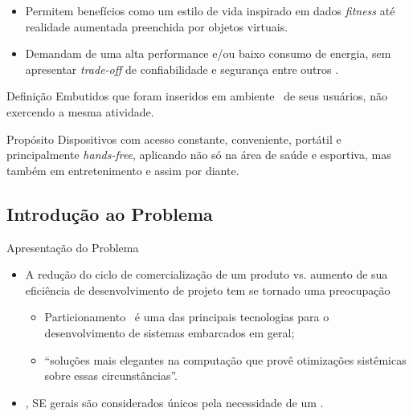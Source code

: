       
      \begin{frame}{\Wearables}
         \begin{itemize}
            \item Permitem benefícios como um estilo de vida inspirado em dados \textit{fitness} até realidade aumentada preenchida por objetos virtuais.
            
            \item Demandam de uma alta performance e/ou baixo consumo de energia, sem apresentar \textit{trade-off} de confiabilidade e segurança entre outros \cite{Jozwiak2017}.
	
         \end{itemize}
         
            \bigskip         
         
         \begin{block}{Definição}
            Embutidos que foram inseridos em ambiente \mobile\ de seus usuários, não exercendo a mesma atividade. 
         \end{block}
         
         \begin{block}{Propósito}
            Dispositivos com acesso constante, conveniente, portátil e principalmente \textit{hands-free}, aplicando não só na área de saúde e esportiva, mas também em entretenimento e assim por diante.
         \end{block}
      \end{frame}
      

   \subsection{Introdução ao Problema}
      \begin{frame}{Apresentação do Problema}
         \begin{itemize} \setlength{\itemsep}{1.8em}
            \item A redução do ciclo de comercialização de um produto vs. aumento de sua eficiência de desenvolvimento de projeto tem se tornado uma preocupação
            
            \begin{itemize} \setlength{\itemsep}{0.8em}
               \item Particionamento \hs\ é uma das principais tecnologias para o desenvolvimento de sistemas embarcados em geral;
               
               \item \cite{Hassine2017} ``soluções mais elegantes na computação que provê otimizações sistêmicas sobre essas circunstâncias''.
            \end{itemize}
            
            \item \cite{Wolf1994}, SE gerais são considerados únicos pela necessidade de um \codesign.

         \end{itemize}
      \end{frame}
      
